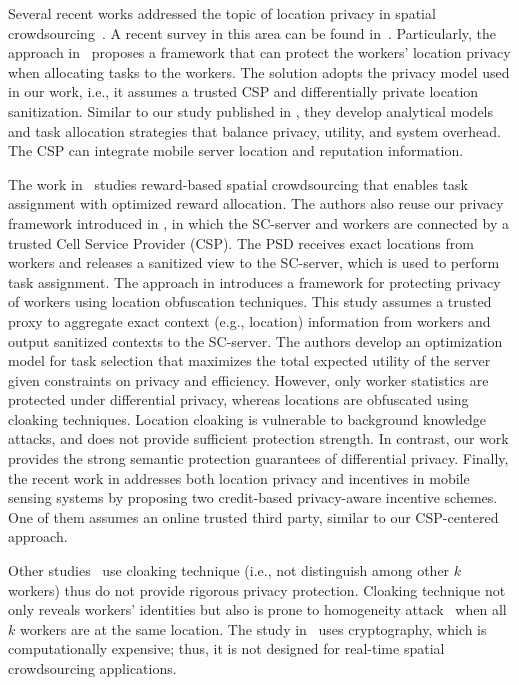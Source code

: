 \documentclass{USC-Thesis}
\numberwithin{equation}{chapter}
\begin{document}
Several recent works addressed the topic of location privacy in spatial crowdsourcing~\cite{pournajaf2014spatial,to2015privgeocrowd,Gong15b,Gong15b,zhang2015differentially,hu2015protecting,Li15}.
A recent survey in this area can be found in~\cite{pournajaf2015participant}.
Particularly, the approach in~\cite{Gong15a} proposes a framework that can protect the workers' location privacy when allocating tasks to the workers. The solution adopts the privacy model used in our work, i.e., it assumes a trusted CSP and differentially private location sanitization. Similar to our study published in \cite{to2014framework,to2016sc}, they develop analytical models and task allocation strategies that balance privacy, utility, and system overhead. The CSP can integrate mobile server location and reputation information.

The work in~\cite{zhang2015differentially} studies reward-based spatial crowdsourcing that enables task assignment with optimized reward allocation. The authors also reuse our privacy framework introduced in \cite{to2014framework}, in which the SC-server and workers are connected by a trusted Cell Service Provider (CSP). The PSD receives exact locations from workers and releases a sanitized view to the SC-server, which is used to perform task assignment. 
The approach in \cite{Gong15b} introduces a framework for protecting privacy of workers using location obfuscation techniques. This study assumes a trusted proxy to aggregate exact context (e.g., location) information from workers and output sanitized contexts to the SC-server. The authors develop an optimization model for task selection that maximizes the total expected utility of the server given constraints on privacy and efficiency. However, only worker statistics are protected under differential privacy, whereas locations are obfuscated using cloaking techniques. Location cloaking is vulnerable to background knowledge attacks, and does not provide sufficient protection strength. In contrast, our work provides the strong semantic protection guarantees of differential privacy. Finally, the recent work in \cite{Li15} addresses both location privacy and incentives in mobile sensing systems by proposing two credit-based privacy-aware incentive schemes. One of them assumes an online trusted third party, similar to our CSP-centered approach. 

Other studies~\cite{pournajaf2014spatial,hu2015protecting} use cloaking technique (i.e., not distinguish among other $k$ workers) thus do not provide rigorous privacy protection. Cloaking technique not only reveals workers' identities but also is prone to homogeneity attack~\cite{machanavajjhala2007diversity} when all $k$ workers are at the same location.
The study in~\cite{Li15} uses cryptography, which is computationally expensive; thus, it is not designed for real-time spatial crowdsourcing applications.
\end{document}
